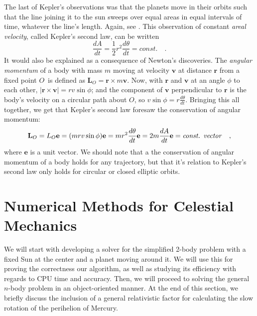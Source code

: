\documentclass[]{article}
\begin{document}
The last of Kepler's observations was that the planets move in their orbits such that the line joining it to the sun sweeps over equal areas in equal intervals of time, whatever the line's length. Again, see \cite{hibbeler2001}. This observation of constant \textit{areal velocity}, called Kepler's second law, can be written
\begin{equation}
	\frac{dA}{dt} = \frac{1}{2} r^2 \frac{d\theta}{dt} = const. \quad.
\end{equation}
It would also be explained as a consequence of Newton's discoveries. The \textit{angular momentum} of a body with mass $m$ moving at velocity $\mathbf{v}$ at distance $\mathbf{r}$ from a fixed point $O$ is defined as $\mathbf{L}_O = \mathbf{r} \times m\mathbf{v}$. Now, with $\mathbf{r}$ and $\mathbf{v}$ at an angle $\phi$ to each other, $|\mathbf{r} \times \mathbf{v}| = rv \sin \phi$; and the component of $\mathbf{v}$ perpendicular to $\mathbf{r}$ is the body's velocity on a circular path about $O$, so $v \sin \phi = r \frac{d\theta}{dt}$. Bringing this all together, we get that Kepler's second law foresaw the conservation of angular momentum:
\begin{equation}
	\mathbf{L}_O = L_O\mathbf{e} = (mrv \sin \phi )\mathbf{e} = mr^2 \frac{d\theta}{dt} \mathbf{e} = 2m \frac{dA}{dt} \mathbf{e} = \text{\textit{const. vector}} \quad,
\end{equation}
where $\mathbf{e}$ is a unit vector. We should note that a the conservation of angular momentum of a body holds for any trajectory, but that it's relation to Kepler's second law only holds for circular or closed elliptic orbits.

\section{Numerical Methods for Celestial Mechanics} \label{methods}

We will start with developing a solver for the simplified 2-body problem with a fixed Sun at the center and a planet moving around it. We will use this for proving the correctness our algorithm, as well as studying its efficiency with regards to CPU time and accuracy. Then, we will proceed to solving the general $n$-body problem in an object-oriented manner. At the end of this section, we briefly discuss the inclusion of a general relativistic factor for calculating the slow rotation of the perihelion of Mercury.
\end{document}
